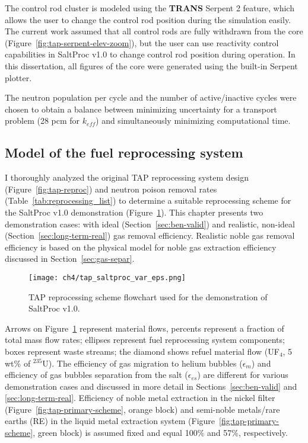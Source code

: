 The control rod cluster is modeled using the \textbf{TRANS} Serpent 2 feature, 
which allows the user to change the control rod position during the 
simulation easily. The current work assumed that all control rods are fully 
withdrawn from the core (Figure~\ref{fig:tap-serpent-elev-zoom}), but the user 
can use reactivity control capabilities in SaltProc v1.0 to change control 
rod position during operation. In this dissertation, all figures of the core 
were generated using the built-in Serpent plotter.

The neutron population per cycle and the number of active/inactive cycles were 
chosen to obtain a balance between minimizing uncertainty for a transport 
problem (28 pcm for $k_{eff}$) and simultaneously minimizing computational 
time.


\subsection{Model of the fuel reprocessing system}\label{sec:tap-online-model}
I thoroughly analyzed the original \gls{TAP} reprocessing system design 
(Figure~\ref{fig:tap-reproc}) and neutron poison removal rates  
(Table~\ref{tab:reprocessing_list}) to determine a suitable reprocessing 
scheme for the SaltProc v1.0 demonstration 
(Figure~\ref{fig:demo-repro-scheme}). This chapter presents two demonstration 
cases: with ideal (Section~\ref{sec:ben-valid}) and realistic, non-ideal 
(Section~\ref{sec:long-term-real}) gas removal efficiency. Realistic noble gas 
removal efficiency is based on the physical model for noble gas extraction 
efficiency discussed in Section~\ref{sec:gas-separ}. 
\begin{figure}[htp!] %
	\centering
	\texttt{[image: ch4/tap\_saltproc\_var\_eps.png]}
	\caption{\gls{TAP} reprocessing scheme flowchart used for the 
	demonstration of SaltProc v1.0.}
	\label{fig:demo-repro-scheme}
\end{figure}

Arrows on Figure~\ref{fig:demo-repro-scheme} represent material flows, 
percents 
represent a fraction of total mass flow rates; ellipses represent fuel 
reprocessing system components; boxes represent waste streams; the diamond 
shows refuel material flow (UF$_4$, 5 wt\% of $^{235}$U). The efficiency 
of gas migration to helium bubbles ($\epsilon_m$) and efficiency of 
gas bubbles separation from the salt ($\epsilon_{es}$) are different for 
various demonstration cases and discussed in more detail in 
Sections~\ref{sec:ben-valid} and \ref{sec:long-term-real}. Efficiency of 
noble metal extraction in the nickel filter 
(Figure~\ref{fig:tap-primary-scheme}, orange block) and semi-noble metals/rare 
earths (RE) in the liquid metal extraction system 
(Figure~\ref{fig:tap-primary-scheme}, green block) is assumed fixed and equal 
100\% and 57\%, respectively.

